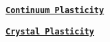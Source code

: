\href{continuumPlasticity.pdf}{\tt {\bfseries Continuum Plasticity}} \par
 \href{crystalPlasticity.pdf}{\tt {\bfseries Crystal Plasticity}} \par
 